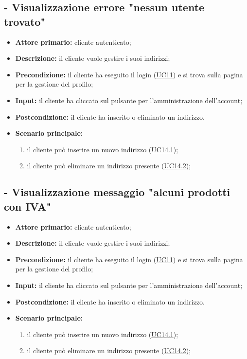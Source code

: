 \stepUserCase
\subsection{ - Visualizzazione errore "nessun utente trovato"}
\begin{itemize}
    \item \textbf{Attore primario:} cliente autenticato;
    \item \textbf{Descrizione:} il cliente vuole gestire i suoi indirizzi;
    \item \textbf{Precondizione:} il cliente ha eseguito il login (\hyperref[UC11]{UC11}) e si trova sulla pagina per la gestione del profilo;
    \item \textbf{Input:} il cliente ha cliccato sul pulsante per l'amministrazione dell'account;
    \item \textbf{Postcondizione:} il cliente ha inserito o eliminato un indirizzo.
    \item \textbf{Scenario principale:}
          \begin{enumerate}
              \item il cliente può inserire un nuovo indirizzo (\hyperref[UC14.1]{UC14.1});
              \item il cliente può eliminare un indirizzo presente (\hyperref[UC14.2]{UC14.2});
          \end{enumerate}
\end{itemize}

\stepUserCase
\subsection{ - Visualizzazione messaggio "alcuni prodotti con IVA" }
\begin{itemize}
    \item \textbf{Attore primario:} cliente autenticato;
    \item \textbf{Descrizione:} il cliente vuole gestire i suoi indirizzi;
    \item \textbf{Precondizione:} il cliente ha eseguito il login (\hyperref[UC11]{UC11}) e si trova sulla pagina per la gestione del profilo;
    \item \textbf{Input:} il cliente ha cliccato sul pulsante per l'amministrazione dell'account;
    \item \textbf{Postcondizione:} il cliente ha inserito o eliminato un indirizzo.
    \item \textbf{Scenario principale:}
          \begin{enumerate}
              \item il cliente può inserire un nuovo indirizzo (\hyperref[UC14.1]{UC14.1});
              \item il cliente può eliminare un indirizzo presente (\hyperref[UC14.2]{UC14.2});
          \end{enumerate}
\end{itemize}

